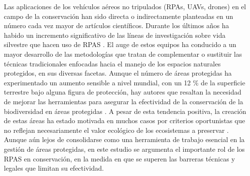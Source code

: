 \documentclass[11pt,]{article}
\begin{document}
Las aplicaciones de los vehículos aéreos no tripulados (RPAs, UAVs,
drones) en el campo de la conservación han sido directa o indirectamente
planteadas en un número cada vez mayor de artículos científicos. Durante
los últimos años ha habido un incremento significativo de las líneas de
investigación sobre vida silvestre que hacen uso de RPAS
\citep{Linchant2015}. El auge de estos equipos ha conducido a un mayor
desarrollo de las metodologías que tratan de complementar o sustituir
las técnicas tradicionales enfocadas hacia el manejo de los espacios
naturales protegidos, en sus diversas facetas. Aunque el número de áreas
protegidas ha experimentado un aumento sensible a nivel mundial, con un
12 \% de la superficie terrestre bajo alguna figura de protección, hay
autores que resaltan la necesidad de mejorar las herramientas para
asegurar la efectividad de la conservación de la biodiversidad en áreas
protegidas \citep{Chape2005}. A pesar de esta tendencia positiva, la
creación de estas áreas ha estado motivada en muchos casos por criterios
oportunistas que no reflejan necesariamente el valor ecológico de los
ecosistemas a preservar \citep{Knight2007}. Aunque aún lejos de
consolidarse como una herramienta de trabajo esencial en la gestión de
áreas protegidas, en este estudio se argumenta el importante rol de los
RPAS en conservación, en la medida en que se superen las barreras
técnicas y legales que limitan su efectividad.
\end{document}

